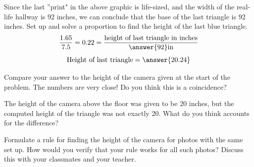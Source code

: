 \documentclass{ximera}
\begin{document}
\begin{exploration}
\begin{question}
    Since the last ''print" in the above graphic is life-sized, and the width of the real-life hallway is $92$ inches, we can conclude that the base of the last triangle is $92$ inches. 
    Set up and solve a proportion to find the height of the last blue triangle.  
    $$\frac{1.65}{7.5}=0.22=\frac{\text{height of last triangle in inches}}{\answer{92}\text{in}}$$
    $$\text{Height of last triangle}=\answer{20.24}$$

    Compare your answer to the height of the camera given at the start of the problem.  The numbers are very close!  Do you think this is a coincidence?  
\end{question}

\begin{question}
    The height of the camera above the floor was given to be $20$ inches, but the computed height of the triangle was not exactly $20$.  What do you think accounts for the difference?
\end{question}

\begin{question}
    Formulate a rule for finding the height of the camera for photos with the same set up.  How would you verify that your rule works for all such photos?  Discuss this with your classmates and your teacher.
\end{question}
\end{exploration}
\end{document}
